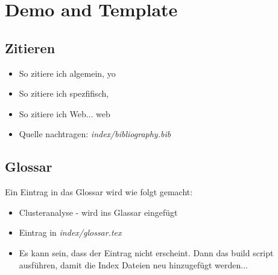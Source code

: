 \chapter{Demo and Template}
\section{Zitieren}
\begin{itemize}
	\item{So zitiere ich algemein, \cite{lin1973} yo}
	\item{So zitiere ich spezfifisch, \cite[S. 15]{lin1973}}
	\item{So zitiere ich Web... web \cite{learnHaskell}}
	\item{Quelle nachtragen: \textit{index/bibliography.bib}}
\end{itemize}

\section{Glossar}
Ein Eintrag in das Glossar wird wie folgt gemacht:
\begin{itemize}
	\item{\Gls{Clusteranalyse} - wird ins Glassar eingefügt}
	\item{Eintrag in \textit{index/glossar.tex}}
	\item{Es kann sein, dass der Eintrag nicht erscheint. Dann das build script ausführen, damit die Index Dateien neu hinzugefügt werden...}
\end{itemize}